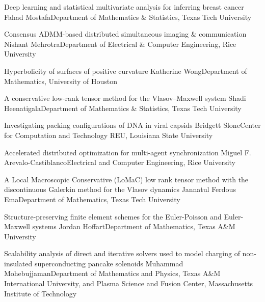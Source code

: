 \begin{posters}
\item\poster
{Deep learning and statistical multivariate analysis for inferring breast cancer}
{Fahad Mostafa}{Department of Mathematics \& Statistics, Texas Tech University}

\item\poster
{Consensus ADMM-based distributed simultaneous imaging \& communication}
{Nishant Mehrotra}{Department of Electrical \& Computer Engineering, Rice University}

\item\poster
{Hyperbolicity of surfaces of positive curvature}
{Katherine Wong}{Department of Mathematics, University of Houston}

\item\poster
{A conservative low-rank tensor method for the Vlasov–Maxwell system}
{Shadi Heenatigala}{Department of Mathematics \& Statistics, Texas Tech University}

\item\poster
{Investigating packing configurations of DNA in viral capsids}
{Bridgett Slone}{Center for Computation and Technology REU, Louisiana State University}

\item\poster
{Accelerated distributed optimization for multi-agent synchronization}
{Miguel F. Arevalo-Castiblanco}{Electrical and Computer Engineering, Rice University}

\item\poster
{A Local Macroscopic Conservative (LoMaC) low rank tensor method with the discontinuous Galerkin method for the Vlasov dynamics}
{Jannatul Ferdous Ema}{Department of Mathematics, Texas Tech University}

\item\poster
{Structure-preserving finite element schemes for the Euler-Poisson and Euler-Maxwell systems}
{Jordan Hoffart}{Department of Mathematics, Texas A\&M University}

\item\poster
{Scalability analysis of direct and iterative solvers used to model charging of non-insulated superconducting pancake solenoids}
{Muhammad Mohebujjaman}{Department of Mathematics and Physics, Texas A\&M International University, and Plasma Science and Fusion Center, Massachusetts Institute of Technology}


\end{posters}

\room

